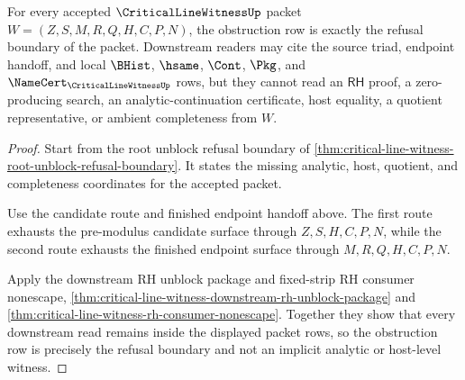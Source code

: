 \begin{theorem}
\label{thm:critical-line-witness-obstruction-separation}
For every accepted $\CriticalLineWitnessUp$ packet $W=(Z,S,M,R,Q,H,C,P,N)$, the obstruction row is exactly the refusal boundary of the packet. Downstream readers may cite the source triad, endpoint handoff, and local $\BHist$, $\hsame$, $\Cont$, $\Pkg$, and $\NameCert_{\CriticalLineWitnessUp}$ rows, but they cannot read an $\mathsf{RH}$ proof, a zero-producing search, an analytic-continuation certificate, host equality, a quotient representative, or ambient completeness from $W$.
\end{theorem}
\begin{proof}
Start from the root unblock refusal boundary of \autoref{thm:critical-line-witness-root-unblock-refusal-boundary}. It states the missing analytic, host, quotient, and completeness coordinates for the accepted packet.

Use the candidate route and finished endpoint handoff above. The first route exhausts the pre-modulus candidate surface through $Z,S,H,C,P,N$, while the second route exhausts the finished endpoint surface through $M,R,Q,H,C,P,N$.

Apply the downstream RH unblock package and fixed-strip RH consumer nonescape, \autoref{thm:critical-line-witness-downstream-rh-unblock-package} and \autoref{thm:critical-line-witness-rh-consumer-nonescape}. Together they show that every downstream read remains inside the displayed packet rows, so the obstruction row is precisely the refusal boundary and not an implicit analytic or host-level witness.
\end{proof}
